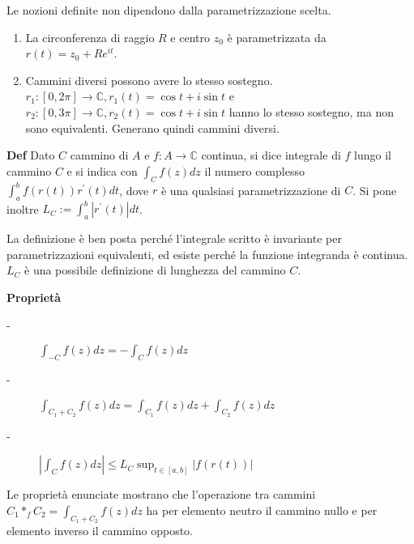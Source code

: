 \documentclass{article}
\begin{document}
Le nozioni definite non dipendono dalla parametrizzazione scelta.

\begin{enumerate}
\item La circonferenza di raggio $R$ e centro $z_{0}$ \`{e} parametrizzata
da $r\left( t\right) =z_{0}+Re^{it}$.

\item Cammini diversi possono avere lo stesso sostegno. $r_{1}:\left[ 0,2\pi %
\right] \rightarrow 
\mathbb{C}
,r_{1}\left( t\right) =\cos t+i\sin t$ e $r_{2}:\left[ 0,3\pi \right]
\rightarrow 
\mathbb{C}
,r_{2}\left( t\right) =\cos t+i\sin t$ hanno lo stesso sostegno, ma non sono
equivalenti. Generano quindi cammini diversi.
\end{enumerate}

\textbf{Def} Dato $C$ cammino di $A$ e $f:A\rightarrow 
\mathbb{C}
$ continua, si dice integrale di $f$ lungo il cammino $C$ e si indica con $%
\int_{C}f\left( z\right) dz$ il numero complesso $\int_{a}^{b}f\left(
r\left( t\right) \right) r^{\prime }\left( t\right) dt$, dove $r$ \`{e} una
qualsiasi parametrizzazione di $C$. Si pone inoltre $L_{C}:=\int_{a}^{b}%
\left\vert r^{\prime }\left( t\right) \right\vert dt$.

La definizione \`{e} ben posta perch\'{e} l'integrale scritto \`{e}
invariante per parametrizzazioni equivalenti, ed esiste perch\'{e} la
funzione integranda \`{e} continua. $L_{C}$ \`{e} una possibile definizione
di lunghezza del cammino $C$.

\textbf{Propriet\`{a}}

\begin{description}
\item[-] $\int_{-C}f\left( z\right) dz=-\int_{C}f\left( z\right) dz$

\item[-] $\int_{C_{1}+C_{2}}f\left( z\right) dz=\int_{C_{1}}f\left( z\right)
dz+\int_{C_{2}}f\left( z\right) dz$

\item[-] $\left\vert \int_{C}f\left( z\right) dz\right\vert \leq
L_{C}\sup_{t\in \left[ a,b\right] }\left\vert f\left( r\left( t\right)
\right) \right\vert $
\end{description}

Le propriet\`{a} enunciate mostrano che l'operazione tra cammini $C_{1}\ast
_{f}C_{2}=\int_{C_{1}+C_{2}}f\left( z\right) dz$ ha per elemento neutro il
cammino nullo e per elemento inverso il cammino opposto.
\end{document}
